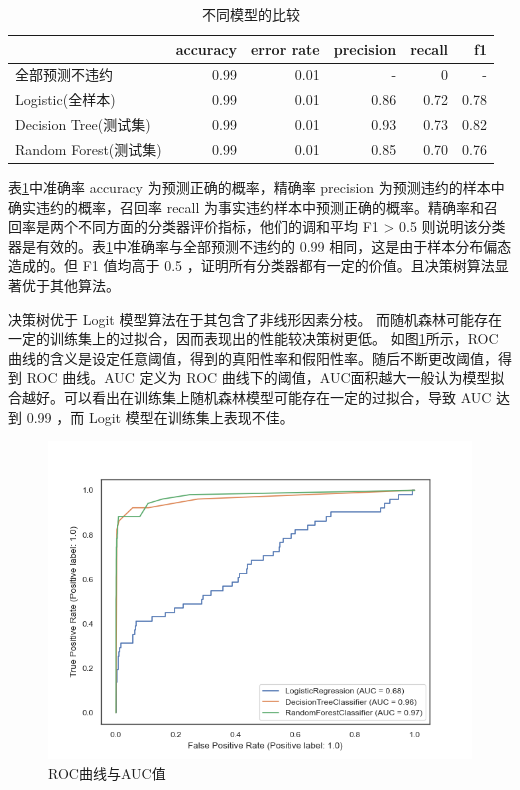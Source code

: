 \begin{table}
	\caption{\label{tab:acc}不同模型的比较}
	\centering
	\begin{tabular}{lrrrrr}
		                      & accuracy & error rate & precision & recall & f1   \\
		\hline
		全部预测不违约        & 0.99     & 0.01       & -         & 0      & -    \\
		Logistic(全样本)      & 0.99     & 0.01       & 0.86      & 0.72   & 0.78 \\
		Decision Tree(测试集) & 0.99     & 0.01       & 0.93      & 0.73   & 0.82 \\
		Random Forest(测试集) & 0.99     & 0.01       & 0.85      & 0.70   & 0.76 \\
	\end{tabular}
\end{table}

表\ref{tab:acc}中准确率 accuracy 为预测正确的概率，精确率 precision 为预测违约的样本中确实违约的概率，召回率 recall 为事实违约样本中预测正确的概率。精确率和召回率是两个不同方面的分类器评价指标，他们的调和平均 F1 > 0.5 则说明该分类器是有效的。表\ref{tab:acc}中准确率与全部预测不违约的 0.99 相同，这是由于样本分布偏态造成的。但 F1 值均高于 0.5 ，证明所有分类器都有一定的价值。且决策树算法显著优于其他算法。

决策树优于 Logit 模型算法在于其包含了非线形因素分枝。
而随机森林可能存在一定的训练集上的过拟合，因而表现出的性能较决策树更低。
如图\ref{fig:roc}所示，ROC 曲线的含义是设定任意阈值，得到的真阳性率和假阳性率。随后不断更改阈值，得到 ROC 曲线。AUC 定义为 ROC 曲线下的阈值，AUC面积越大一般认为模型拟合越好。可以看出在训练集上随机森林模型可能存在一定的过拟合，导致 AUC 达到 0.99 ，而 Logit 模型在训练集上表现不佳。
\begin{figure}[h]
	\centering
	\includegraphics[width=.9\linewidth]{./data/roc.png}
	\caption{\label{fig:roc}ROC曲线与AUC值}
\end{figure}

